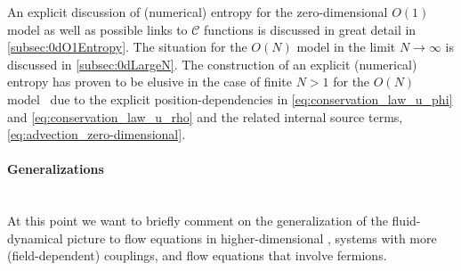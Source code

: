 An explicit discussion of (numerical) entropy for the zero-dimensional $O(1)$ model as well as possible links to $\mathcal{C}$ functions is discussed in great detail in \cref{subsec:0dO1Entropy}.
The situation for the $O(N)$ model in the limit $N\rightarrow\infty$ is discussed in \cref{subsec:0dLargeN}.
The construction of an explicit (numerical) entropy has proven to be elusive in the case of finite $N>1$ for the $O(N)$ model~\cite{Koenigstein:2021rxj,Steil:2021cbu} due to the explicit position-dependencies in \cref{eq:conservation_law_u_phi} and \eqref{eq:conservation_law_u_rho} and the related internal source terms, \cf{} \cref{eq:advection_zero-dimensional}.

\paragraph{Generalizations}\label{paragraph:conservative_form_generalizations}\mbox{}\\
At this point we want to briefly comment on the generalization of the fluid-dynamical picture to \frg{} flow equations in higher-dimensional \qfts{}, systems with more (field-dependent) couplings, and \frg{} flow equations that involve fermions.

